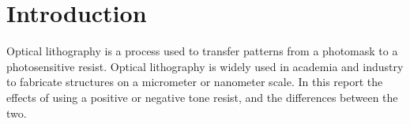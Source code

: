 \section*{Introduction}
Optical lithography is a process used to transfer patterns from a photomask to a photosensitive resist. Optical lithography is widely used in academia and industry to fabricate structures on a micrometer or nanometer scale. In this report the effects of using a positive or negative tone resist, and the differences between the two.